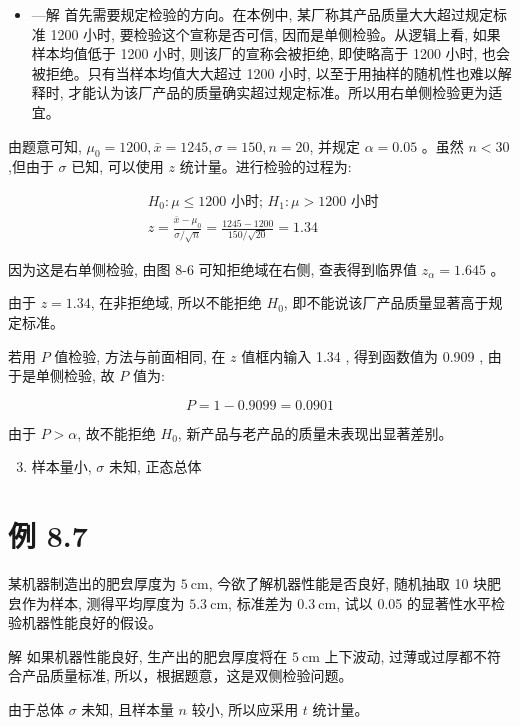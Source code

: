 \documentclass[10pt]{article}
\begin{document}
\begin{CJK*}{UTF8}{bsmi}
\begin{itemize}
  \item —解 首先需要规定检验的方向。在本例中, 某厂称其产品质量大大超过规定标准 1200 小时, 要检验这个宣称是否可信, 因而是单侧检验。从逻辑上看, 如果样本均值低于 1200 小时, 则该厂的宣称会被拒绝, 即使略高于 1200 小时, 也会被拒绝。只有当样本均值大大超过 1200 小时, 以至于用抽样的随机性也难以解释时, 才能认为该厂产品的质量确实超过规定标准。所以用右单侧检验更为适宜。
\end{itemize}

由题意可知, $\mu_{0}=1200, \bar{x}=1245, \sigma=150, n=20$, 并规定 $\alpha=0.05$ 。虽然 $n<30$,但由于 $\sigma$ 已知, 可以使用 $z$ 统计量。进行检验的过程为:

$$
\begin{aligned}
& H_{0}: \mu \leqslant 1200 \text { 小时; } H_{1}: \mu>1200 \text { 小时 } \\
& z=\frac{\bar{x}-\mu_{0}}{\sigma / \sqrt{n}}=\frac{1245-1200}{150 / \sqrt{20}}=1.34
\end{aligned}
$$

因为这是右单侧检验, 由图 8-6 可知拒绝域在右侧, 查表得到临界值 $z_{\alpha}=1.645$ 。

由于 $z=1.34$, 在非拒绝域, 所以不能拒绝 $H_{0}$, 即不能说该厂产品质量显著高于规定标准。

若用 $P$ 值检验, 方法与前面相同, 在 $z$ 值框内输入 1.34 , 得到函数值为 0.909 , 由于是单侧检验, 故 $P$ 值为:

$$
P=1-0.9099=0.0901
$$

由于 $P>\alpha$, 故不能拒绝 $H_{0}$, 新产品与老产品的质量未表现出显著差别。

\begin{enumerate}
  \setcounter{enumi}{2}
  \item 样本量小, $\sigma$ 未知, 正态总体
\end{enumerate}

\section*{例 8.7}
某机器制造出的肥㿝厚度为 $5 \mathrm{~cm}$, 今欲了解机器性能是否良好, 随机抽取 10 块肥㿝作为样本, 测得平均厚度为 $5.3 \mathrm{~cm}$, 标准差为 $0.3 \mathrm{~cm}$, 试以 0.05 的显著性水平检验机器性能良好的假设。

解 如果机器性能良好, 生产出的肥㿝厚度将在 $5 \mathrm{~cm}$ 上下波动, 过薄或过厚都不符合产品质量标准, 所以，根据题意，这是双侧检验问题。

由于总体 $\sigma$ 未知, 且样本量 $n$ 较小, 所以应采用 $t$ 统计量。


\end{CJK*}
\end{document}

